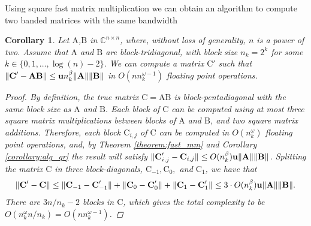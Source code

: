 \documentclass{article}
\newtheorem{corollary}{Corollary}[section]
\newcommand\matA{\boldsymbol{\mathrm{A}}}
\newcommand\matB{\boldsymbol{\mathrm{B}}}
\newcommand\matC{\boldsymbol{\mathrm{C}}}
\newcommand{\umach}{\textbf{\textup{u}}}
\begin{document}
Using square fast matrix multiplication we can obtain an algorithm to compute two banded matrices with the same bandwidth
\begin{corollary}
    \label{corollary:block_tridiagonal_mm}
    Let $\matA$,$\matB$ in $\mathbb{C}^{n\times n}$, where, without loss of generality, $n$ is a power of two. Assume that $\matA$ and $\matB$ are block-tridiagonal, with block size $n_k=2^k$ for some $k\in \{0,1,\ldots,\log(n)-2\}$. We can compute a matrix $\matC'$ such that $\|\matC'-\matA\matB\|\leq \umach n_k^{\beta}\|\matA\|\|\matB\|$ in $O(nn_k^{\omega-1})$ floating point operations.
    \begin{proof}
        By definition, the true matrix $\matC=\matA\matB$ is block-pentadiagonal with the same block size as $\matA$ and $\matB$. Each block of $\matC$ can be computed using at most three square matrix multiplications between blocks of $\matA$ and $\matB$, and two square matrix additions. Therefore, each block $\matC_{i,j}$ of $\matC$ can be computed in $O(n_k^{\omega})$ floating point operations, and, by Theorem \ref{theorem:fast_mm} and Corollary \ref{corollary:alg_qr} the result will satisfy
        $\|\matC'_{i,j}-\matC_{i,j}\| \leq O(n_k^\beta)\umach\|\matA\|\|\matB\|$. Splitting the matrix $\matC$ in three block-diagonals, $\matC_{-1},\matC_0,$ and $\matC_1$, we have that
        \begin{align*}
            \|\matC'-\matC\| \leq \|\matC_{-1}-\matC'_{-1}\| + \|\matC_0-\matC'_0\| + \|\matC_{1}-\matC'_1\|
            \leq 3\cdot O(n_k^\beta)\umach\|\matA\|\|\matB\|.
        \end{align*}
        There are $3n/n_k-2$ blocks in $\matC$, which gives the total complexity to be $O(n_k^{\omega}n/n_k)= O(nn_k^{\omega-1})$.
    \end{proof}
\end{corollary}
\end{document}
